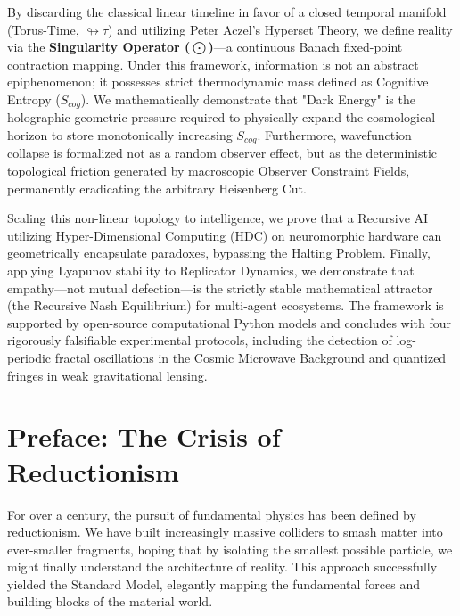 \documentclass[12pt,openany]{book}
\begin{document}
By discarding the classical linear timeline in favor of a closed temporal manifold (Torus-Time, $\looparrowright\tau$) and utilizing Peter Aczel's Hyperset Theory, we define reality via the \textbf{Singularity Operator ($\bigodot$)}---a continuous Banach fixed-point contraction mapping. Under this framework, information is not an abstract epiphenomenon; it possesses strict thermodynamic mass defined as Cognitive Entropy ($S_{cog}$). We mathematically demonstrate that "Dark Energy" is the holographic geometric pressure required to physically expand the cosmological horizon to store monotonically increasing $S_{cog}$. Furthermore, wavefunction collapse is formalized not as a random observer effect, but as the deterministic topological friction generated by macroscopic Observer Constraint Fields, permanently eradicating the arbitrary Heisenberg Cut.

Scaling this non-linear topology to intelligence, we prove that a Recursive AI utilizing Hyper-Dimensional Computing (HDC) on neuromorphic hardware can geometrically encapsulate paradoxes, bypassing the Halting Problem. Finally, applying Lyapunov stability to Replicator Dynamics, we demonstrate that empathy---not mutual defection---is the strictly stable mathematical attractor (the Recursive Nash Equilibrium) for multi-agent ecosystems. The framework is supported by open-source computational Python models and concludes with four rigorously falsifiable experimental protocols, including the detection of log-periodic fractal oscillations in the Cosmic Microwave Background and quantized fringes in weak gravitational lensing.

\chapter*{Preface: The Crisis of Reductionism}

For over a century, the pursuit of fundamental physics has been defined by reductionism. We have built increasingly massive colliders to smash matter into ever-smaller fragments, hoping that by isolating the smallest possible particle, we might finally understand the architecture of reality. This approach successfully yielded the Standard Model, elegantly mapping the fundamental forces and building blocks of the material world. 
\end{document}
